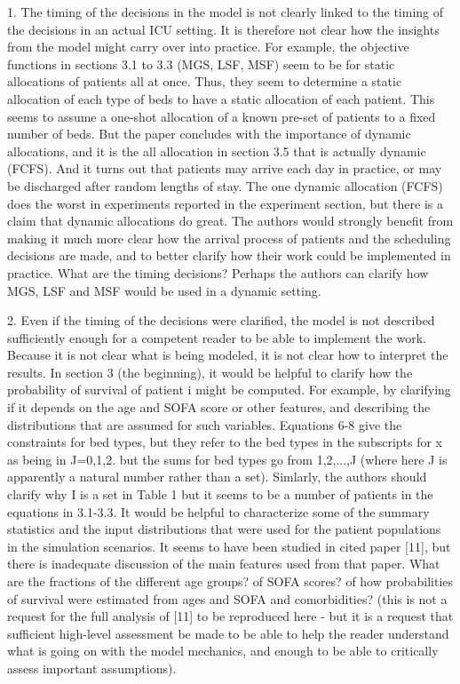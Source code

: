 1. The timing of the decisions in the model is not clearly linked to the timing of the decisions in an actual ICU setting. It is therefore not clear how the insights from the model might carry over into practice. For example, the objective functions in sections 3.1 to 3.3 (MGS, LSF, MSF) seem to be for static allocations of patients all at once. Thus, they seem to determine a static allocation of each type of beds to have a static allocation of each patient. This seems to assume a one-shot allocation of a known pre-set of patients to a fixed number of beds. But the paper concludes with the importance of dynamic allocations, and it is the all allocation in section 3.5 that is actually dynamic (FCFS). And it turns out that patients may arrive each day in practice, or may be discharged after random lengths of stay. The one dynamic allocation (FCFS) does the worst in experiments reported in the experiment section, but there is a claim that dynamic allocations do great. The authors would strongly benefit from making it much more clear how the arrival process of patients and the scheduling decisions are made, and to better clarify how their work could be implemented in practice. What are the timing decisions? Perhaps the authors can clarify how MGS, LSF and MSF would be used in a dynamic setting.

2. Even if the timing of the decisions were clarified, the model is not described sufficiently enough for a competent reader to be able to implement the work. Because it is not clear what is being modeled, it is not clear how to interpret the results. In section 3 (the beginning), it would be helpful to clarify how the probability of survival of patient i might be computed. For example, by clarifying if it depends on the age and SOFA score or other features, and describing the distributions that are assumed for such variables. Equations 6-8 give the constraints for bed types, but they refer to the bed types in the subscripts for x as being in J={0,1,2}. but the sums for bed types go from 1,2,...,J (where here J is apparently a natural number rather than a set). Simlarly, the authors should clarify why I is a set in Table 1 but it seems to be a number of patients in the equations in 3.1-3.3. It would be helpful to characterize some of the summary statistics and the input distributions that were used for the patient populations in the simulation scenarios. It seems to have been studied in cited paper [11], but there is inadequate discussion of the main features used from that paper. What are the fractions of the different age groups? of SOFA scores? of how probabilities of survival were estimated from ages and SOFA and comorbidities? (this is not a request for the full analysis of [11] to be reproduced here - but it is a request that sufficient high-level assessment be made to be able to help the reader understand what is going on with the model mechanics, and enough to be able to critically assess important assumptions).

